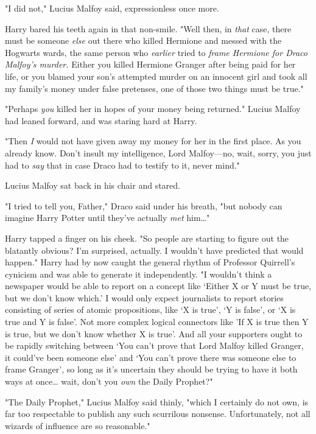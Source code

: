 "I did not," Lucius Malfoy said, expressionless once more.

Harry bared his teeth again in that non-smile. "Well then, in \emph{that} case, 
there must be someone \emph{else} out there who killed Hermione and messed with 
the Hogwarts wards, the same person who \emph{earlier} tried to \emph{frame 
Hermione for Draco Malfoy's murder.} Either you killed Hermione Granger after 
being paid for her life, or you blamed your son's attempted murder on an 
innocent girl and took all my family's money under false pretenses, one of 
those two things must be true."

"Perhaps \emph{you} killed her in hopes of your money being returned." Lucius 
Malfoy had leaned forward, and was staring hard at Harry.

"Then \emph{I} would not have given away my money for her in the first place. 
As you already know. Don't insult my intelligence, Lord Malfoy---no, wait, 
sorry, you just had to \emph{say} that in case Draco had to testify to it, 
never mind."

Lucius Malfoy sat back in his chair and stared.

"I tried to tell you, Father," Draco said under his breath, "but nobody can 
imagine Harry Potter until they've actually \emph{met} him{\ldots}"

Harry tapped a finger on his cheek. "So people are starting to figure out the 
blatantly obvious? I'm surprised, actually. I wouldn't have predicted that 
would happen." Harry had by now caught the general rhythm of Professor 
Quirrell's cynicism and was able to generate it independently. "I wouldn't 
think a newspaper would be able to report on a concept like `Either X or Y must 
be true, but we don't know which.' I would only expect journalists to report 
stories consisting of series of atomic propositions, like `X is true', `Y is 
false', or `X is true and Y is false'. Not more complex logical connectors like 
'If X is true then Y is true, but we don't know whether X is true'. And all 
your supporters ought to be rapidly switching between `You can't prove that 
Lord Malfoy killed Granger, it could've been someone else' and `You can't prove 
there was someone else to frame Granger', so long as it's uncertain they should 
be trying to have it both ways at once{\ldots} wait, don't you \emph{own} the 
Daily Prophet?"

"The Daily Prophet," Lucius Malfoy said thinly, "which I certainly do not own, 
is far too respectable to publish any such scurrilous nonsense. Unfortunately, 
not all wizards of influence are so reasonable."

